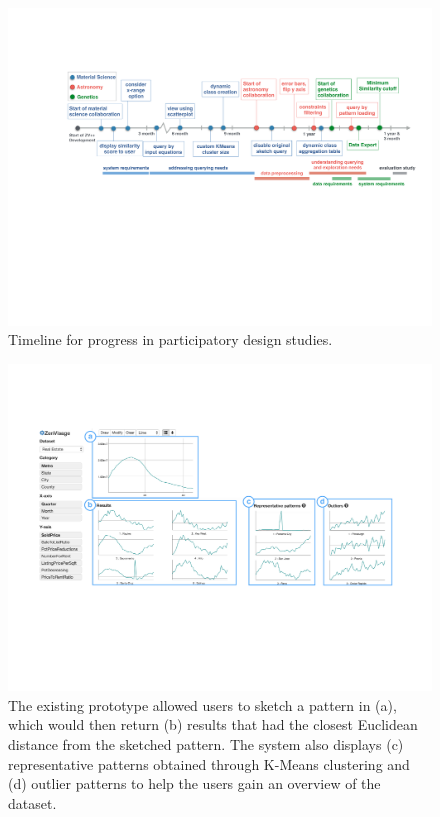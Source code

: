  \begin{figure}[h!]
 \captionsetup{font=normalsize,labelfont=normalsize}
 	\centering
   \includegraphics[width=0.75\linewidth]{figures/timeline.pdf}
 	\caption{Timeline for progress in participatory design studies.}
 	\label{timeline}
 \end{figure}
 \begin{figure}[h!]
 \captionsetup{font=normalsize,labelfont=normalsize}
 	\centering
 	\includegraphics[width=0.6\linewidth]{figures/oldZV_nozql.pdf}
 	\caption{The existing \zv prototype allowed users to sketch a pattern in (a), which would then return (b) results that had the closest Euclidean distance from the sketched pattern. The system also displays (c) representative patterns obtained through K-Means clustering and (d) outlier patterns to help the users gain an overview of the dataset.}
 	\label{oldZV}
 \end{figure}
